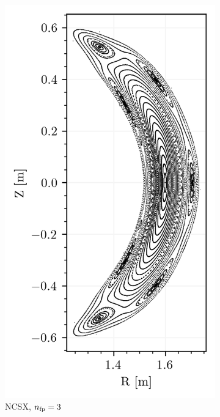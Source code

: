 \begin{figure}[H]
\begin{subfigure}[c]{0.32\textwidth}
        \centering
        \includegraphics[width=\textwidth]{images/theory/ncsx.png}
        \caption{NCSX, $n_\text{fp} = 3$}
        \label{fig:ncsx-default}
    \end{subfigure}
    \hfill
    \begin{subfigure}[c]{0.32\textwidth}
        \centering

\end{subfigure}
\end{figure}
